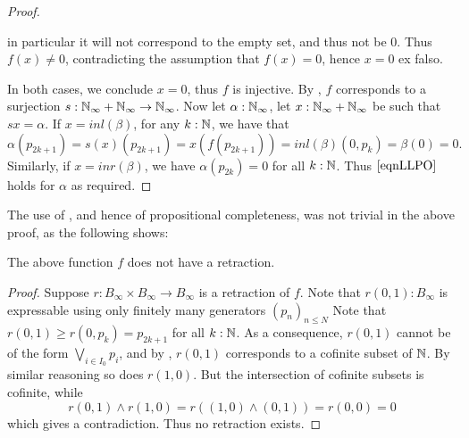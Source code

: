 \begin{proof}
\begin{itemize}
      in particular it will not correspond to the empty set, and thus not be $0$.
      Thus $f(x)\neq 0$, contradicting the assumption that $f(x) = 0$, hence $x=0$ ex falso. 
  \end{itemize}
  In both cases, we conclude $x=0$, thus $f$ is injective. 
  By , $f$ corresponds to a surjection 
  $s:\mathbb{N}_{\infty} + \mathbb{N}_{\infty} \to \mathbb{N}_{\infty}$.
  Now let $\alpha : \mathbb{N}_{\infty}$, 
  let $x:\mathbb{N}_{\infty} + \mathbb{N}_{\infty}$ be such that $s x = \alpha$. 
  If $x = inl(\beta)$, 
  for any $k:\mathbb{N}$, we have that 
  $$\alpha (p_{2k+1}) = s(x) (p_{2k+1}) = x(f(p_{2k+1})) = inl(\beta) (0,p_k)  = \beta(0) = 0.$$
  Similarly, if $x = inr(\beta)$, we have $\alpha(p_{2k}) = 0$ for all $k:\mathbb{N}$. 
  Thus $\Cref{eqnLLPO}$ holds for $\alpha$ as required. 
\end{proof}

The use of , and hence of propositional completeness, 
was not trivial in the above proof, as the following shows:
\begin{lemma}
  The above function $f$ does not have a retraction. 
\end{lemma}
\begin{proof}
  Suppose $r:B_\infty \times B_\infty \to B_\infty$ is a retraction of $f$. 
  Note that $r(0,1):B_\infty$ is expressable using only finitely many generators $(p_n)_{n\leq N}$
  Note that $r(0,1) \geq r(0,p_k) = p_{2k+1}$ for all $k:\mathbb{N}$. 
  As a consequence, $r(0,1)$ cannot be of the form $\bigvee_{i\in I_0} p_i$, and by , 
  $r(0,1)$ corresponds to a cofinite subset of $\mathbb{N}$. %
  By similar reasoning so does $r(1,0)$.%
  But the intersection of cofinite subsets is cofinite, while 
  $$r(0,1) \wedge r(1,0) = r( (1,0) \wedge (0,1)) = r(0,0) = 0$$
  which gives a contradiction. Thus no retraction exists. 
\end{proof}

